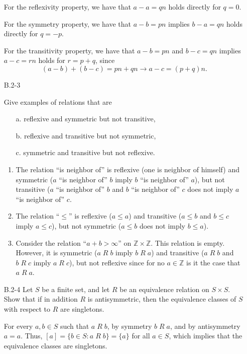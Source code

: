 \documentclass{report}
\makeatletter
\renewenvironment{framed}{%
 \def\FrameCommand##1{\hskip\@totalleftmargin
 \fboxsep=\FrameSep\fbox{##1}}%
 \MakeFramed {\advance\hsize-\width
   \@totalleftmargin\z@ \linewidth\hsize
   \@setminipage}}%
 {\par\unskip\endMakeFramed}
\makeatother
\begin{document}
\begin{enumerate}
\begin{framed}
For the reflexivity property, we have that $a - a = qn$ holds directly for $q = 0$.

For the symmetry property, we have that $a - b = p n$ implies $b - a = q n$ holds directly for $q = -p$.

For the transitivity property, we have that $a - b = pn$ and $b - c = qn$ implies $a - c = rn$ holds for $r = p + q$, since
\[
  (a - b) + (b - c) = pn + qn \rightarrow a - c = (p + q) n.
\]

\end{framed}

\item[B.2{-}3]{Give examples of relations that are
\begin{enumerate}
\item[a.] reflexive and symmetric but not transitive,
\item[b.] reflexive and transitive but not symmetric,
\item[c.] symmetric and transitive but not reflexive.
\end{enumerate}
}

\begin{framed}
\begin{enumerate}
\item The relation ``is neighbor of'' is reflexive (one is neighbor of
  himself) and symmetric ($a$ ``is neighbor of'' $b$ imply $b$ ``is neighbor
  of'' $a$), but not transitive ($a$ ``is neighbor of'' $b$ and $b$ ``is
  neighbor of'' $c$ does not imply $a$ ``is neighbor of'' $c$.
\item The relation ``$\le$'' is reflexive ($a \le a$) and transitive ($a \le b$
  and $b \le c$ imply $a \le c$), but not symmetric ($a \le b$ does not imply
  $b \le a$).
\item Consider the relation ``$a + b > \infty$'' on $\mathbb{Z} \times \mathbb{Z}$.
  This relation is empty. However, it is symmetric ($a\;R\;b$ imply $b\;R\;a$)
  and transitive ($a\;R\;b$ and $b\;R\;c$ imply $a\;R\;c$), but not reflexive
  since for no $a \in \mathbb{Z}$ is it the case that $a\;R\;a$.
\end{enumerate}
\end{framed}

\item[B.2{-}4]{Let $S$ be a finite set, and let $R$ be an equivalence relation
on $S \times S$. Show that if in addition $R$ is antisymmetric, then the
equivalence classes of $S$ with respect to $R$ are singletons.}

\begin{framed}
For every $a, b \in S$ such that $a\;R\;b$, by symmetry $b\;R\;a$, and by
antisymmetry $a = a$. Thus, $[a] = \{b \in S : a\;R\;b\} = \{a\}$ for all
$a \in S$, which implies that the equivalence classes are singletons.
\end{framed}


\end{enumerate}
\end{document}
